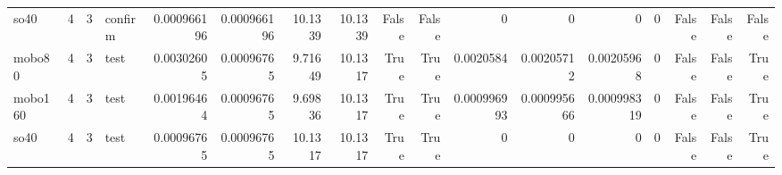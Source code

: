 \begin{tabular}{lrrlrrrrrrrrrrrrr}
so40 & 4 & 3 & confirm & 0.000966196 & 0.000966196 & 10.1339 & 10.1339 & False & False & 0 & 0 & 0 & 0 & False & False & False \\
mobo80 & 4 & 3 & test & 0.00302605 & 0.00096765 & 9.71649 & 10.1317 & True & True & 0.0020584 & 0.00205712 & 0.00205968 & 0 & False & False & True \\
mobo160 & 4 & 3 & test & 0.00196464 & 0.00096765 & 9.69836 & 10.1317 & True & True & 0.000996993 & 0.000995666 & 0.000998319 & 0 & False & False & True \\
so40 & 4 & 3 & test & 0.00096765 & 0.00096765 & 10.1317 & 10.1317 & True & True & 0 & 0 & 0 & 0 & False & False & True \\
\bottomrule
\end{tabular}
